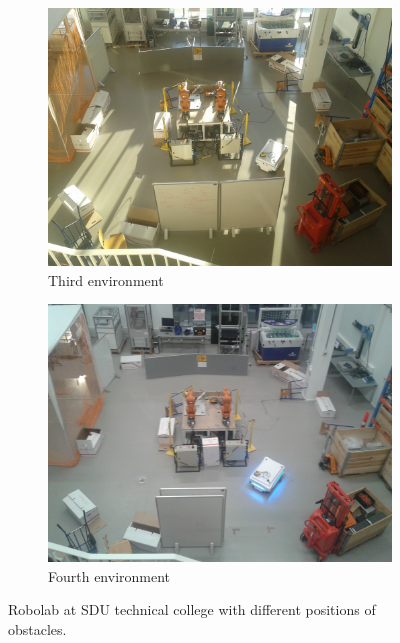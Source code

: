 \begin{figure}[htbp]
\begin{subfigure}[t]{0.499\textwidth}
		\centering
		\includegraphics[width=1\textwidth]{chapters/evaluation/figures/mayhem_robolab3}
		\caption{Third environment}
		\label{fig:location_environment3}
	\end{subfigure}
	\begin{subfigure}[t]{0.499\textwidth}
		\centering
		\includegraphics[width=1\textwidth]{chapters/evaluation/figures/mayhem_robolab4}
		\caption{Fourth environment}
		\label{fig:location_environment4}
	\end{subfigure}
	\caption{Robolab at SDU technical college with different positions of obstacles.}
	\label{fig:robolab_mayhem}
\end{figure}

